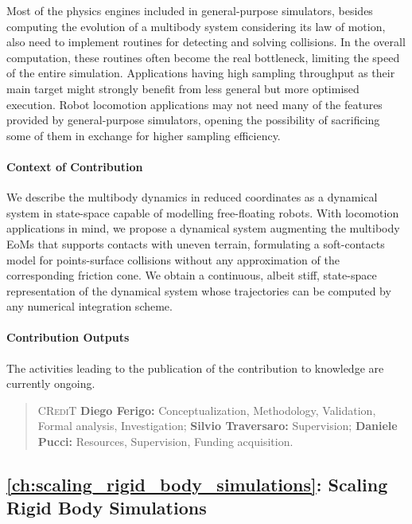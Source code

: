 Most of the physics engines included in general-purpose simulators, besides computing the evolution of a multibody system considering its law of motion, also need to implement routines for detecting and solving collisions.
In the overall computation, these routines often become the real bottleneck, limiting the speed of the entire simulation.
Applications having high sampling throughput as their main target might strongly benefit from less general but more optimised execution.
Robot locomotion applications may not need many of the features provided by general-purpose simulators, opening the possibility of sacrificing some of them in exchange for higher sampling efficiency.

\paragraph{Context of Contribution}

We describe the multibody dynamics in reduced coordinates as a dynamical system in state-space capable of modelling free-floating robots.
With locomotion applications in mind, we propose a dynamical system augmenting the multibody \acp{EoM} that supports contacts with uneven terrain, formulating a soft-contacts model for points-surface collisions without any approximation of the corresponding friction cone.
We obtain a continuous, albeit stiff, state-space representation of the dynamical system whose trajectories can be computed by any numerical integration scheme.

\paragraph{Contribution Outputs}

The activities leading to the publication of the contribution to knowledge are currently ongoing.
%
\begin{quote}
    \textsc{CRediT} \hspace{2mm}
    \textbf{Diego Ferigo:} Conceptualization, Methodology, Validation, Formal analysis, Investigation;
    \textbf{Silvio Traversaro:} Supervision;
    \textbf{Daniele Pucci:} Resources, Supervision, Funding acquisition.
\end{quote}

\subsection{\autoref{ch:scaling_rigid_body_simulations}: Scaling Rigid Body Simulations}

